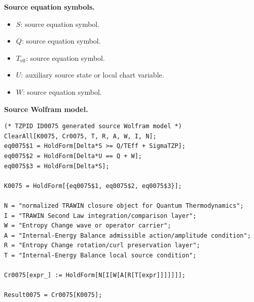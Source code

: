\begin{minipage}[t]{0.49\linewidth}
\begingroup
\small
\raggedright
\textbf{Source equation symbols.}\par
\begin{itemize}[leftmargin=1.35em,itemsep=1pt,topsep=1pt,parsep=0pt]
    \item $S$: source equation symbol.
    \item $Q$: source equation symbol.
    \item $T_{\mathrm{eff}}$: source equation symbol.
    \item $U$: auxiliary source state or local chart variable.
    \item $W$: source equation symbol.
\end{itemize}
\endgroup
\end{minipage}\hfill
\begin{minipage}[t]{0.47\linewidth}
\begingroup
\scriptsize
\raggedright
\textbf{Source Wolfram model.}\par
\begin{Verbatim}[fontsize=\tiny,breaklines=true,breakanywhere=true]
(* TZPID ID0075 generated source Wolfram model *)
ClearAll[K0075, Cr0075, T, R, A, W, I, N];
eq0075$1 = HoldForm[Delta*S >= Q/TEff + SigmaTZP];
eq0075$2 = HoldForm[Delta*U == Q + W];
eq0075$3 = HoldForm[Delta*S];

K0075 = HoldForm[{eq0075$1, eq0075$2, eq0075$3}];

N = "normalized TRAWIN closure object for Quantum Thermodynamics";
I = "TRAWIN Second Law integration/comparison layer";
W = "Entropy Change wave or operator carrier";
A = "Internal-Energy Balance admissible action/amplitude condition";
R = "Entropy Change rotation/curl preservation layer";
T = "Internal-Energy Balance local source condition";

Cr0075[expr_] := HoldForm[N[I[W[A[R[T[expr]]]]]]];

Result0075 = Cr0075[K0075];
\end{Verbatim}
\endgroup
\end{minipage}

